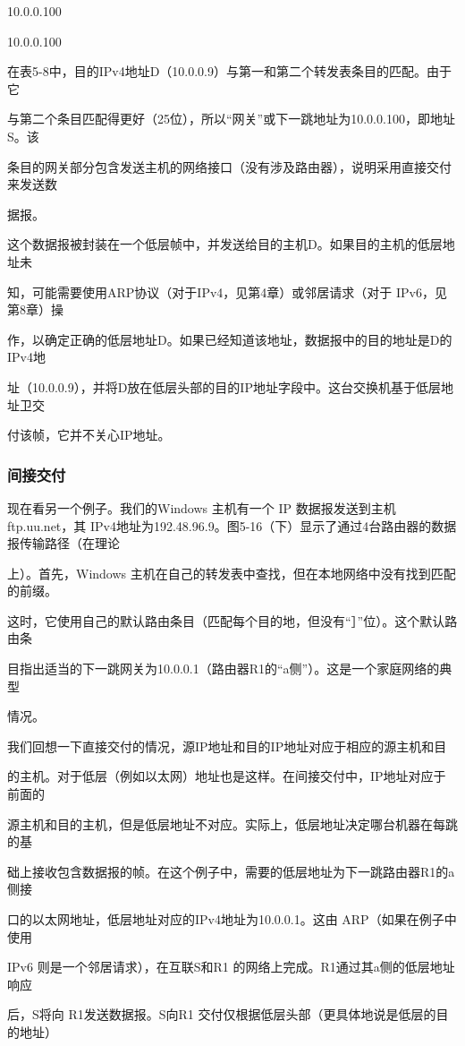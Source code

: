10.0.0.100

10.0.0.100

在表5-8中，目的IPv4地址D（10.0.0.9）与第一和第二个转发表条目的匹配。由于它

与第二个条目匹配得更好（25位），所以“网关”或下一跳地址为10.0.0.100，即地址S。该

条目的网关部分包含发送主机的网络接口（没有涉及路由器），说明采用直接交付来发送数

据报。

这个数据报被封装在一个低层帧中，并发送给目的主机D。如果目的主机的低层地址未

知，可能需要使用ARP协议（对于IPv4，见第4章）或邻居请求（对于 IPv6，见第8章）操

作，以确定正确的低层地址D。如果已经知道该地址，数据报中的目的地址是D的IPv4地

址（10.0.0.9），并将D放在低层头部的目的IP地址字段中。这台交换机基于低层地址卫交

付该帧，它并不关心IP地址。

\subsubsection{间接交付}
现在看另一个例子。我们的Windows 主机有一个 IP 数据报发送到主机 ftp.uu.net，其
IPv4地址为192.48.96.9。图5-16（下）显示了通过4台路由器的数据报传输路径（在理论

上）。首先，Windows 主机在自己的转发表中查找，但在本地网络中没有找到匹配的前缀。

这时，它使用自己的默认路由条目（匹配每个目的地，但没有“］”位）。这个默认路由条

目指出适当的下一跳网关为10.0.0.1（路由器R1的“a侧”）。这是一个家庭网络的典型

情况。

我们回想一下直接交付的情况，源IP地址和目的IP地址对应于相应的源主机和目

的主机。对于低层（例如以太网）地址也是这样。在间接交付中，IP地址对应于前面的

源主机和目的主机，但是低层地址不对应。实际上，低层地址决定哪台机器在每跳的基

础上接收包含数据报的帧。在这个例子中，需要的低层地址为下一跳路由器R1的a侧接

口的以太网地址，低层地址对应的IPv4地址为10.0.0.1。这由 ARP（如果在例子中使用

IPv6 则是一个邻居请求），在互联S和R1 的网络上完成。R1通过其a侧的低层地址响应

后，S将向 R1发送数据报。S向R1 交付仅根据低层头部（更具体地说是低层的目的地址）

